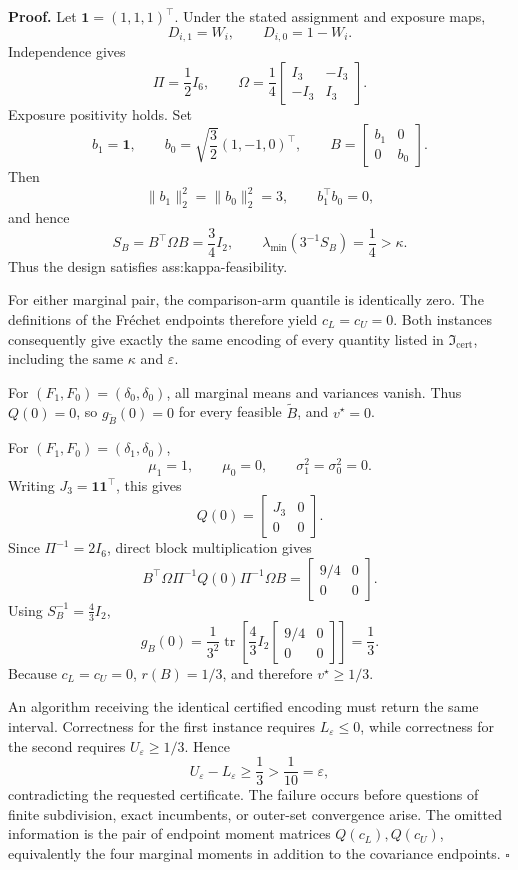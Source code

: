 \textbf{Proof.}
Let \(\mathbf 1=(1,1,1)^{\top}\).  Under the stated assignment and exposure maps,
\[
D_{i,1}=W_i,\qquad D_{i,0}=1-W_i.
\]
Independence gives
\[
\Pi=\frac12 I_6,\qquad
\Omega=\frac14\begin{bmatrix}I_3&-I_3\\-I_3&I_3\end{bmatrix}.
\]
Exposure positivity holds.  Set
\[
b_1=\mathbf 1,\qquad
b_0=\sqrt{\frac32}(1,-1,0)^{\top},\qquad
B=\begin{bmatrix}b_1&0\\0&b_0\end{bmatrix}.
\]
Then
\[
\lVert b_1\rVert_2^2=\lVert b_0\rVert_2^2=3,
\qquad b_1^{\top}b_0=0,
\]
and hence
\[
S_B=B^{\top}\Omega B=\frac34I_2,\qquad
\lambda_{\min}(3^{-1}S_B)=\frac14>\kappa.
\]
Thus the design satisfies ass:kappa-feasibility.

For either marginal pair, the comparison-arm quantile is identically zero.  The definitions of the Fr\'{e}chet endpoints therefore yield \(c_L=c_U=0\).  Both instances consequently give exactly the same encoding of every quantity listed in \(\mathfrak I_{\mathrm{cert}}\), including the same \(\kappa\) and \(\varepsilon\).

For \((F_1,F_0)=(\delta_0,\delta_0)\), all marginal means and variances vanish.  Thus \(Q(0)=0\), so \(g_{\widetilde B}(0)=0\) for every feasible \(\widetilde B\), and \(v^\star=0\).

For \((F_1,F_0)=(\delta_1,\delta_0)\),
\[
\mu_1=1,\qquad \mu_0=0,\qquad
\sigma_1^2=\sigma_0^2=0.
\]
Writing \(J_3=\mathbf 1\mathbf 1^{\top}\), this gives
\[
Q(0)=\begin{bmatrix}J_3&0\\0&0\end{bmatrix}.
\]
Since \(\Pi^{-1}=2I_6\), direct block multiplication gives
\[
B^{\top}\Omega\Pi^{-1}Q(0)\Pi^{-1}\Omega B
=\begin{bmatrix}9/4&0\\0&0\end{bmatrix}.
\]
Using \(S_B^{-1}=\tfrac43I_2\),
\[
g_B(0)
=\frac1{3^2}\operatorname{tr}\!\left[
\frac43I_2\begin{bmatrix}9/4&0\\0&0\end{bmatrix}
\right]
=\frac13.
\]
Because \(c_L=c_U=0\), \(r(B)=1/3\), and therefore \(v^\star\ge1/3\).

An algorithm receiving the identical certified encoding must return the same interval.  Correctness for the first instance requires \(L_{\varepsilon}\le0\), while correctness for the second requires \(U_{\varepsilon}\ge1/3\).  Hence
\[
U_{\varepsilon}-L_{\varepsilon}\ge\frac13>\frac1{10}=\varepsilon,
\]
contradicting the requested certificate.  The failure occurs before questions of finite subdivision, exact incumbents, or outer-set convergence arise.  The omitted information is the pair of endpoint moment matrices \(Q(c_L),Q(c_U)\), equivalently the four marginal moments in addition to the covariance endpoints. \(\square\)